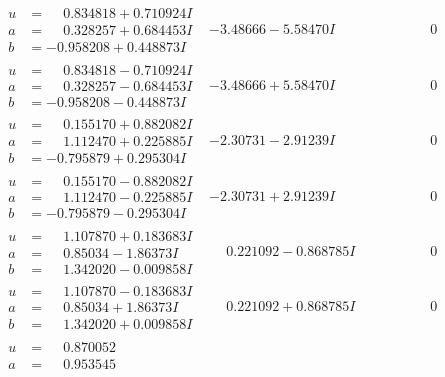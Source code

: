 \documentclass[1p]{elsarticle_modified}
\theoremstyle{definition}
\begin{document}
$$\begin{array}{c|c|c}
\begin{aligned}
u &= \phantom{-}0.834818 + 0.710924 I \\
a &= \phantom{-}0.328257 + 0.684453 I \\
b &= -0.958208 + 0.448873 I\end{aligned}
 & -3.48666 - 5.58470 I & \phantom{-0.000000 } 0 \\ \hline\begin{aligned}
u &= \phantom{-}0.834818 - 0.710924 I \\
a &= \phantom{-}0.328257 - 0.684453 I \\
b &= -0.958208 - 0.448873 I\end{aligned}
 & -3.48666 + 5.58470 I & \phantom{-0.000000 } 0 \\ \hline\begin{aligned}
u &= \phantom{-}0.155170 + 0.882082 I \\
a &= \phantom{-}1.112470 + 0.225885 I \\
b &= -0.795879 + 0.295304 I\end{aligned}
 & -2.30731 - 2.91239 I & \phantom{-0.000000 } 0 \\ \hline\begin{aligned}
u &= \phantom{-}0.155170 - 0.882082 I \\
a &= \phantom{-}1.112470 - 0.225885 I \\
b &= -0.795879 - 0.295304 I\end{aligned}
 & -2.30731 + 2.91239 I & \phantom{-0.000000 } 0 \\ \hline\begin{aligned}
u &= \phantom{-}1.107870 + 0.183683 I \\
a &= \phantom{-}0.85034 - 1.86373 I \\
b &= \phantom{-}1.342020 - 0.009858 I\end{aligned}
 & \phantom{-}0.221092 - 0.868785 I & \phantom{-0.000000 } 0 \\ \hline\begin{aligned}
u &= \phantom{-}1.107870 - 0.183683 I \\
a &= \phantom{-}0.85034 + 1.86373 I \\
b &= \phantom{-}1.342020 + 0.009858 I\end{aligned}
 & \phantom{-}0.221092 + 0.868785 I & \phantom{-0.000000 } 0 \\ \hline\begin{aligned}
u &= \phantom{-}0.870052\phantom{ +0.000000I} \\
a &= \phantom{-}0.953545\phantom{ +0.000000I} \\

\end{aligned}
\end{array}$$
\end{document}
